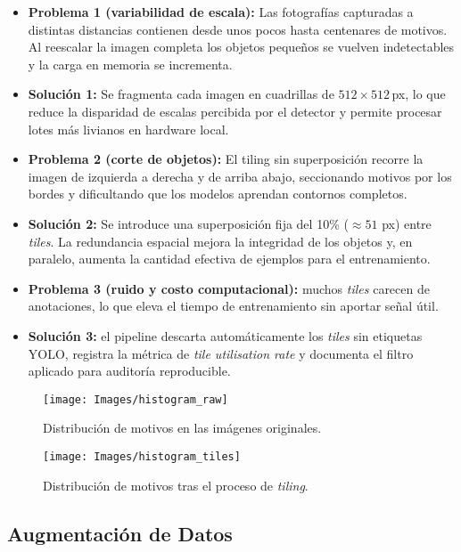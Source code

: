 \begin{itemize}
   \item \textbf{Problema 1 (variabilidad de escala):}
   Las fotografías capturadas a distintas distancias contienen desde unos pocos hasta centenares de motivos.
   Al reescalar la imagen completa los objetos pequeños se vuelven indetectables y la carga en memoria se incrementa.
   \item \textbf{Solución 1:}
   Se fragmenta cada imagen en cuadrillas de \(512\times512\)\,px, lo que reduce la disparidad de escalas percibida por el detector y permite procesar lotes más livianos en hardware local.

   \item \textbf{Problema 2 (corte de objetos):}
   El tiling sin superposición recorre la imagen de izquierda a derecha y de arriba abajo, seccionando motivos por los bordes y dificultando que los modelos aprendan contornos completos.
   \item \textbf{Solución 2:}
   Se introduce una superposición fija del 10\% ($\approx 51$ px) entre \emph{tiles}.
   La redundancia espacial mejora la integridad de los objetos y, en paralelo, aumenta la cantidad efectiva de ejemplos para el entrenamiento.

   \item \textbf{Problema 3 (ruido y costo computacional):} muchos \emph{tiles} carecen de anotaciones, lo que eleva el tiempo de entrenamiento sin aportar señal útil.
   \item \textbf{Solución 3:} el pipeline descarta automáticamente los \emph{tiles} sin etiquetas YOLO, registra la métrica de \emph{tile utilisation rate} y documenta el filtro aplicado para auditoría reproducible.
\end{itemize}

\begin{figure}[!h]
  \centering
  \texttt{[image: Images/histogram\_raw]}
  \caption{Distribución de motivos en las imágenes originales.}
  \label{fig:hist_raw}
\end{figure}

\begin{figure}[!h]
  \centering
  \texttt{[image: Images/histogram\_tiles]}
  \caption{Distribución de motivos tras el proceso de \textit{tiling}.}
  \label{fig:hist_tiles}
\end{figure}

\subsection{Augmentación de Datos}\label{ssec:augmentacion}

